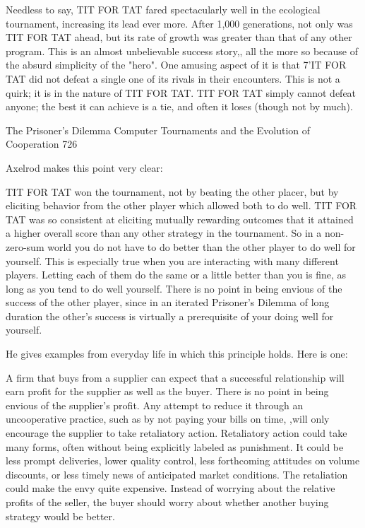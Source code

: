          Needless to say, TIT FOR TAT fared spectacularly well in the ecological
tournament, increasing its lead ever more. After 1,000 generations, not only was TIT
FOR TAT ahead, but its rate of growth was greater than that of any other program. This
is an almost unbelievable success story,, all the more so because of the absurd simplicity
of the "hero". One amusing aspect of it is that 7'IT FOR TAT did not defeat a single one
of its rivals in their encounters. This is not a quirk; it is in the nature of TIT FOR TAT.
TIT FOR TAT simply cannot defeat anyone; the best it can achieve is a tie, and often it
loses (though not by much).




The Prisoner's Dilemma Computer Tournaments and the Evolution of Cooperation               726

Axelrod makes this point very clear:

TIT FOR TAT won the tournament, not by beating the other placer, but by eliciting behavior
from the other player which allowed both to do well. TIT FOR TAT was so consistent at eliciting
mutually rewarding outcomes that it attained a higher overall score than any other strategy in the
tournament.
        So in a non-zero-sum world you do not have to do better than the other player to do well
for yourself. This is especially true when you are interacting with many different players. Letting
each of them do the same or a little better than you is fine, as long as you tend to do well yourself.
There is no point in being envious of the success of the other player, since in an iterated Prisoner's
Dilemma of long duration the other's success is virtually a prerequisite of your doing well for
yourself.

He gives examples from everyday life in which this principle holds. Here is one:

A firm that buys from a supplier can expect that a successful relationship will earn profit for the
supplier as well as the buyer. There is no point in being envious of the supplier's profit. Any
attempt to reduce it through an uncooperative practice, such as by not paying your bills on time,
,will only encourage the supplier to take retaliatory action. Retaliatory action could take many
forms, often without being explicitly labeled as punishment. It could be less prompt deliveries,
lower quality control, less forthcoming attitudes on volume discounts, or less timely news of
anticipated market conditions. The retaliation could make the envy quite expensive. Instead of
worrying about the relative profits of the seller, the buyer should worry about whether another
buying strategy would be better.

